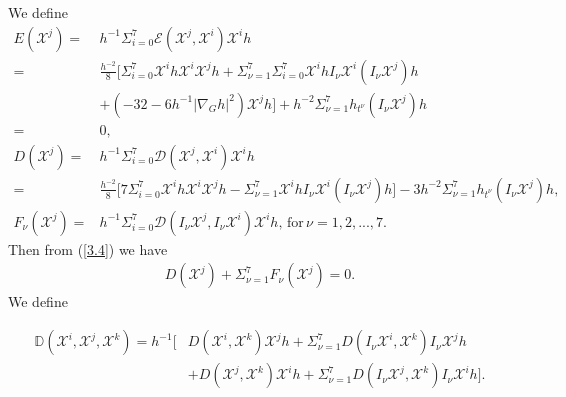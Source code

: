 \documentclass[10pt,a4paper]{amsart}
\numberwithin{equation}{section}
\begin{document}
 We define  
\begin{align*}
   E(\mathscr{X}^j)=&h^{-1}\Sigma_{i=0}^7\mathcal{E}( \mathscr{X}^j, \mathscr{X}^i)\mathscr{X}^i h   \\=&\frac{h^{-2}}{8}\bigg[\Sigma_{i=0}^7\mathscr{X}^i h\mathscr{X}^i\mathscr{X}^jh+\Sigma_{\nu=1}^7\Sigma_{i=0}^7\mathscr{X}^ihI_\nu \mathscr{X}^i(I_\nu \mathscr{X}^j)h\\&+(-32-6h^{-1}|\nabla_G h|^2)\mathscr{X}^j h\bigg]+h^{-2}\Sigma_{\nu=1}^7h_{t^\nu}(I_\nu \mathscr{X}^j)h\\=&0,\\
    D(\mathscr{X}^j)=&h^{-1}\Sigma_{i=0}^7\mathcal{D}( \mathscr{X}^j, \mathscr{X}^i)\mathscr{X}^i h\\=&\frac{h^{-2}}{8}\bigg[7\Sigma_{i=0}^7\mathscr{X}^i h\mathscr{X}^i\mathscr{X}^j h-\Sigma_{\nu=1}^7 \mathscr{X}^ihI_\nu \mathscr{X}^i(I_\nu \mathscr{X}^j) h\bigg]-3h^{-2}\Sigma_{\nu=1}^7h_{t^\nu}(I_\nu \mathscr{X}^j)h,\\
    F_\nu(\mathscr{X}^j)=&h^{-1}\Sigma_{i=0}^7\mathcal{D}(I_\nu \mathscr{X}^j,I_\nu \mathscr{X}^i)\mathscr{X}^i h,\,\textrm{for}\,\nu=1,2,...,7.
\end{align*}   
Then from (\ref{3.4}) we have
\begin{align}\label{3.7}
    D(\mathscr{X}^j)+\Sigma_{\nu=1}^7 F_\nu (\mathscr{X}^j)=0.
\end{align}
We define

\begin{equation}\label{3.8}
\begin{aligned}
    \mathbb{D}(\mathscr{X}^i,\mathscr{X}^j,\mathscr{X}^k)=h^{-1}\bigg[&D(\mathscr{X}^i,\mathscr{X}^k)\mathscr{X}^jh+\Sigma_{\nu=1}^7D(I_\nu \mathscr{X}^i,\mathscr{X}^k)I_\nu \mathscr{X}^j h\\&+D(\mathscr{X}^j,\mathscr{X}^k)\mathscr{X}^ih+\Sigma_{\nu=1}^7D(I_\nu \mathscr{X}^j,\mathscr{X}^k)I_\nu \mathscr{X}^i h\bigg].
\end{aligned}
\end{equation}
\end{document}
